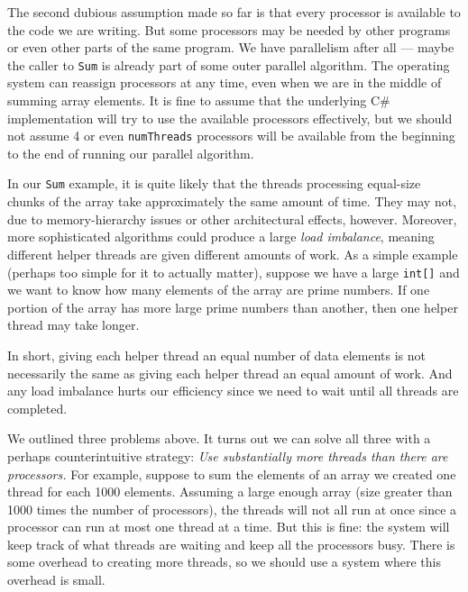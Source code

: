 \documentclass[10pt]{article}
\begin{document}
\medskip
{}
\medskip

The second dubious assumption made so far is that every processor is
available to the code we are writing.  But some processors may be
needed by other programs or even other parts of the same program.  We
have parallelism after all --- maybe the caller to {\tt Sum} is
already part of some outer parallel algorithm.  The operating system
can reassign processors at any time, even when we are in the middle of
summing array elements.  It is fine to assume that the underlying C\#
implementation will try to use the available processors effectively,
but we should not assume 4 or even {\tt numThreads} processors will be
available from the beginning to the end of running our parallel algorithm.  

\medskip
{}
\medskip

In our {\tt Sum} example, it is quite likely that the threads
processing equal-size chunks of the array take approximately the same
amount of time.  They may not, due to memory-hierarchy issues or other
architectural effects, however.  Moreover, more sophisticated
algorithms could produce a large \emph{load imbalance}, meaning different
helper threads are given different amounts of work.  As a simple
example (perhaps too simple for it to actually matter), suppose we
have a large {\tt int[]} and we want to know how many elements of the
array are prime numbers.  If one portion of the array has more large
prime numbers than another, then one helper thread may take longer.

In short, giving each helper thread an equal number of data elements
is not necessarily the same as giving each helper thread an equal
amount of work.  And any load imbalance hurts our efficiency
since we need to wait until all threads are completed.

\medskip
{}
\medskip

We outlined three problems above.  It turns out we can solve all three
with a perhaps counterintuitive strategy: \emph{Use substantially more
  threads than there are processors.}  For example, suppose to sum the
elements of an array we created one thread for each 1000 elements.
Assuming a large enough array (size greater than 1000 times the number of
processors), the threads will not all run at once since a processor
can run at most one thread at a time.  But this is fine: the system
will keep track of what threads are waiting and keep all the
processors busy.  There is some overhead to creating more threads, so
we should use a system where this overhead is small.
\end{document}
